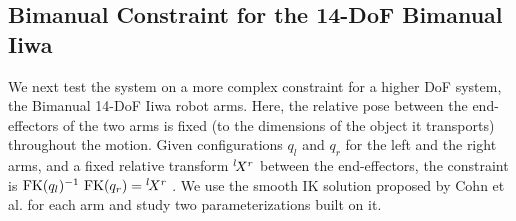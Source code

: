 \documentclass[letterpaper, 10 pt, conference]{ieeeconf}
\begin{document}







\subsection{Bimanual Constraint for the 14-DoF Bimanual Iiwa}


We next test the system on a more complex constraint for a higher DoF system, the Bimanual 14-DoF Iiwa robot arms. Here, the relative pose between the end-effectors of the two arms is fixed (to the dimensions of the object it transports) throughout the motion. Given configurations $q_l$ and $q_r$ for the left and the right arms, and a fixed relative transform $\monogram{X}{l}{r}$ between the end-effectors, the constraint is $\FK(q_l)^{-1}\,\FK(q_r) = \monogram{X}{l}{r}$ .  We use the smooth IK solution proposed by Cohn et al. \cite{cohn2024constrained} for each arm and study two parameterizations built on it.
\end{document}
